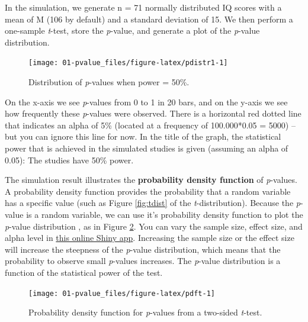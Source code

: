 \documentclass[
  oneside]{book}
\begin{document}
In the simulation, we generate n = 71 normally distributed IQ scores with a mean of M (106 by default) and a standard deviation of 15. We then perform a one-sample \emph{t}-test, store the \emph{p}-value, and generate a plot of the \emph{p}-value distribution.



\begin{figure}

{\centering \texttt{[image: 01-pvalue\_files/figure-latex/pdistr1-1]} 

}

\caption{Distribution of \emph{p}-values when power = 50\%.}\label{fig:pdistr1}
\end{figure}

On the x-axis we see \emph{p}-values from 0 to 1 in 20 bars, and on the y-axis we see how frequently these \emph{p}-values were observed. There is a horizontal red dotted line that indicates an alpha of 5\% (located at a frequency of 100.000*0.05 = 5000) -- but you can ignore this line for now. In the title of the graph, the statistical power that is achieved in the simulated studies is given (assuming an alpha of 0.05): The studies have 50\% power.

The simulation result illustrates the \textbf{probability density function} of \emph{p}-values. A probability density function provides the probability that a random variable has a specific value (such as Figure \ref{fig:tdist} of the \emph{t}-distribution). Because the \emph{p}-value is a random variable, we can use it's probability density function to plot the \emph{p}-value distribution \citep{hung_behavior_1997, ulrich_properties_2018}, as in Figure \ref{fig:pdft}. You can vary the sample size, effect size, and alpha level in \href{http://shiny.ieis.tue.nl/d_p_power/}{this online Shiny app}. Increasing the sample size or the effect size will increase the steepness of the \emph{p}-value distribution, which means that the probability to observe small \emph{p}-values increases. The \emph{p}-value distribution is a function of the statistical power of the test.



\begin{figure}

{\centering \texttt{[image: 01-pvalue\_files/figure-latex/pdft-1]} 

}

\caption{Probability density function for \emph{p}-values from a two-sided \emph{t}-test.}\label{fig:pdft}
\end{figure}
\end{document}
